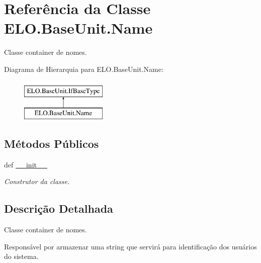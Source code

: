 \hypertarget{classELO_1_1BaseUnit_1_1Name}{\section{Referência da Classe E\-L\-O.\-Base\-Unit.\-Name}
\label{classELO_1_1BaseUnit_1_1Name}
}


Classe container de nomes.  


Diagrama de Hierarquia para E\-L\-O.\-Base\-Unit.\-Name\-:\begin{figure}[H]
\begin{center}
\leavevmode
\includegraphics[height=2.000000cm]{d9/dff/classELO_1_1BaseUnit_1_1Name}
\end{center}
\end{figure}
\subsection*{Métodos Públicos}
\begin{DoxyCompactItemize}
\item 
def \hyperlink{classELO_1_1BaseUnit_1_1Name_ad73fdab6426635b79b4447ac53c10279}{\-\_\-\-\_\-init\-\_\-\-\_\-}
\begin{DoxyCompactList}\small\item\em Construtor da classe. \end{DoxyCompactList}\end{DoxyCompactItemize}


\subsection{Descrição Detalhada}
Classe container de nomes. 

Responsável por armazenar uma string que servirá para identificação dos usuários do sistema. 

